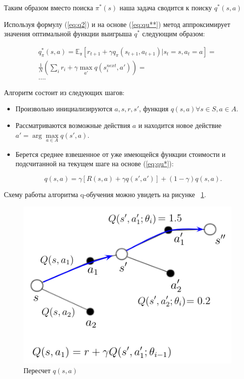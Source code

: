 Таким образом вместо поиска $\pi^*(s)$ наша задача сводится к поиску $q^*(s, a)$


Используя формулу (\ref{eq:q2}) и на основе (\ref{eq:qu**}) метод аппроксимирует значения оптимальной функции выигрыша $q^*$ следующим образом:

\begin{equation}
	\begin{split}
    q^*_{\pi}(s, a) = \mathbb{E_\pi} [ r_{t+1} + \gamma q_\pi(s_{t+1}, a_{t+1}) | s_t=s, a_t=a] = \\
     \frac{1}{N} \left( \sum\limits_{i} r_i + \gamma \max_{a'} q(s^{next}_i, a') \right) = \\ \dots.
    \end{split}
	\label{eq:qu*}
\end{equation}

Алгоритм состоит из следующих шагов:
\begin{itemize}
    \item Произвольно инициализируются $a, s, r, s'$, функция  $q(s, a) \forall s \in S, a \in A$.
    \item Рассматриваются возможные действия $a$ и находится новое действие $a' = \arg \max\limits_{a \in A}q(s', a) $.
    \item Берется среднее взвешенное от уже имеющейся функции стоимости и подсчитанной на текущем шаге на основе (\ref{eq:qu*}):  
    
    \begin{equation}
    	q(s, a) = \gamma [R(s, a) +\gamma q(s', a')] + (1-\gamma)q(s, a).
    	\label{eq:qu3}
    \end{equation}
\end{itemize}

Схему работы алгоритма  q-обучения можно увидеть на рисунке ~\ref{fig:q-learn}. \newpage

\begin{figure}[h]
	\centering
	\includegraphics[scale=1]{q_learn.png}
	\caption {Пересчет $q(s, a)$}
	\label{fig:q-learn}
\end{figure}

